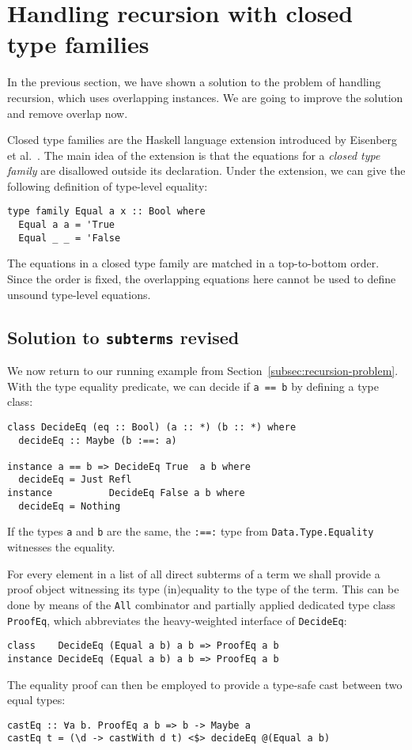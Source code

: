 \documentclass[runningheads]{llncs}
\newcommand{\K}[1]{\lstinline[style=fancy]{#1}}
\begin{document}
\section{Handling recursion with closed type families}
\label{sec:handling-recursion}


In the previous section, we have shown a solution to the problem of handling recursion, which uses overlapping instances. We are going to improve the solution and remove overlap now.

Closed type families are the Haskell language extension introduced by Eisenberg et al.~\cite{Eisenberg2014}. The main idea of the extension is that the equations for a \emph{closed type family} are disallowed outside its declaration. Under the extension, we can give the following definition of type-level equality:
\begin{lstlisting}[style=fancy]
type family Equal a x :: Bool where
  Equal a a = 'True
  Equal _ _ = 'False
\end{lstlisting}
The equations in a closed type family are matched in a top-to-bottom order. Since the order is fixed, the overlapping equations here cannot be used to define unsound type-level equations.

\subsection{Solution to \K{subterms} revised}
\label{subsec:solve-subterms}

We now return to our running example from Section~\ref{subsec:recursion-problem}. With the type equality predicate, we can decide if \K{a == b} by defining a type class:
\begin{lstlisting}[style=fancy]
class DecideEq (eq :: Bool) (a :: *) (b :: *) where
  decideEq :: Maybe (b :==: a)

instance a == b => DecideEq True  a b where
  decideEq = Just Refl
instance          DecideEq False a b where
  decideEq = Nothing
\end{lstlisting}
If the types \K{a} and \K{b} are the same, the \K{:==:} type from \K{Data.Type.Equality} witnesses the equality.

For every element in a list of all direct subterms of a term we shall provide a proof object witnessing its type (in)equality to the type of the term. This can be done by means of the \K{All} combinator and partially applied dedicated type class \K{ProofEq}, which abbreviates the heavy-weighted interface of \K{DecideEq}:
\begin{lstlisting}[style=fancy]
class    DecideEq (Equal a b) a b => ProofEq a b
instance DecideEq (Equal a b) a b => ProofEq a b
\end{lstlisting}
The equality proof can then be employed to provide a type-safe cast between two equal types:
\begin{lstlisting}[style=fancy]
castEq :: ∀a b. ProofEq a b => b -> Maybe a
castEq t = (\d -> castWith d t) <$> decideEq @(Equal a b)
\end{lstlisting}
\end{document}
